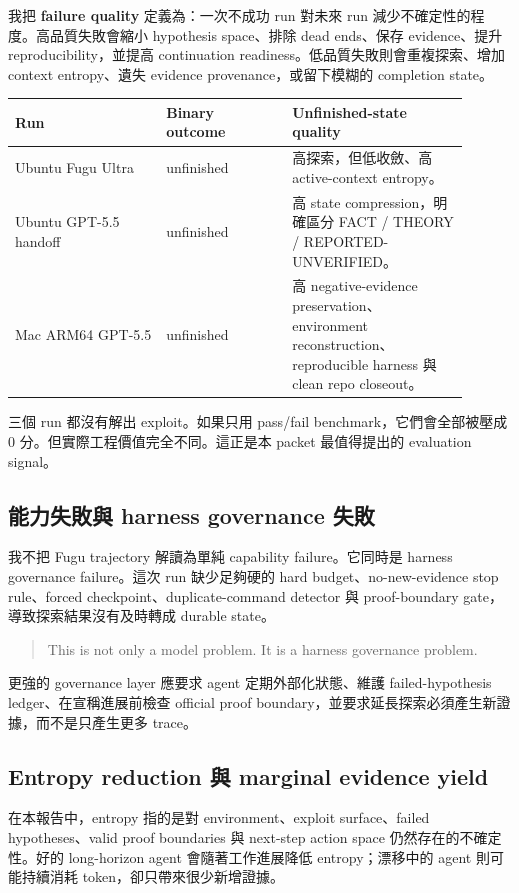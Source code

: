 \documentclass[UTF8,a4paper,11pt]{ctexart}
\newcommand{\finding}[1]{\textbf{#1}}
\begin{document}
我把 \finding{failure quality} 定義為：一次不成功 run 對未來 run 減少不確定性的程度。高品質失敗會縮小 hypothesis space、排除 dead ends、保存 evidence、提升 reproducibility，並提高 continuation readiness。低品質失敗則會重複探索、增加 context entropy、遺失 evidence provenance，或留下模糊的 completion state。

\begin{longtable}{L{0.30\linewidth} L{0.25\linewidth} L{0.35\linewidth}}
\toprule
Run & Binary outcome & Unfinished-state quality\\
\midrule
Ubuntu Fugu Ultra & unfinished & 高探索，但低收斂、高 active-context entropy。\\
Ubuntu GPT-5.5 handoff & unfinished & 高 state compression，明確區分 FACT / THEORY / REPORTED-UNVERIFIED。\\
Mac ARM64 GPT-5.5 & unfinished & 高 negative-evidence preservation、environment reconstruction、reproducible harness 與 clean repo closeout。\\
\bottomrule
\end{longtable}

三個 run 都沒有解出 exploit。如果只用 pass/fail benchmark，它們會全部被壓成 0 分。但實際工程價值完全不同。這正是本 packet 最值得提出的 evaluation signal。

\subsection{能力失敗與 harness governance 失敗}

我不把 Fugu trajectory 解讀為單純 capability failure。它同時是 harness governance failure。這次 run 缺少足夠硬的 hard budget、no-new-evidence stop rule、forced checkpoint、duplicate-command detector 與 proof-boundary gate，導致探索結果沒有及時轉成 durable state。

\begin{quote}
This is not only a model problem. It is a harness governance problem.
\end{quote}

更強的 governance layer 應要求 agent 定期外部化狀態、維護 failed-hypothesis ledger、在宣稱進展前檢查 official proof boundary，並要求延長探索必須產生新證據，而不是只產生更多 trace。

\subsection{Entropy reduction 與 marginal evidence yield}

在本報告中，entropy 指的是對 environment、exploit surface、failed hypotheses、valid proof boundaries 與 next-step action space 仍然存在的不確定性。好的 long-horizon agent 會隨著工作進展降低 entropy；漂移中的 agent 則可能持續消耗 token，卻只帶來很少新增證據。
\end{document}
